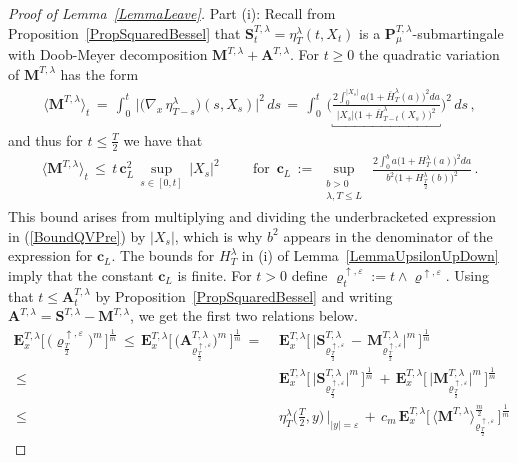 \documentclass[10pt]{article}
\numberwithin{equation}{section}
\theoremstyle{definition}
\begin{document}
\begin{proof}[Proof of Lemma~\ref{LemmaLeave}]  Part (i): Recall from Proposition~\ref{PropSquaredBessel}  that  $\mathbf{S}^{T,\lambda }_t=\eta_{T}^{\lambda}(t,X_t)$ is a $\mathbf{P}^{T,\lambda}_{\mu}$-submartingale with Doob-Meyer decomposition $ \mathbf{M}^{T,\lambda}+ \mathbf{A}^{T,\lambda}$.  For $t\geq 0$ the quadratic variation of $\mathbf{M}^{T,\lambda}$ has the form
\begin{align}\label{BoundQVPre}
 \big\langle \mathbf{M}^{T ,\lambda} \big\rangle_{t}\,=\,\int_0^t \,\Big|\big(\nabla_x\,\eta^{\lambda}_{T-s}\big)(s,X_s)  \Big|^2\, ds\,=\, \int_0^t\, \Bigg( \underbracket{\frac{2\int_0^{|X_s|} a\big( 1+\bar{H}_{T}^{\lambda}(a)\big)^2    da  }{|X_s| \big( 1+\bar{H}_{T-t}^{\lambda}(X_s)\big)^2   }} \Bigg)^2\, ds \,,
 \end{align}
 and thus for $t\leq \frac{T}{2}$ we have that
 \begin{align}\label{BoundQV}
     \big\langle \mathbf{M}^{T ,\lambda} \big\rangle_{t} \,\leq \,t\,\mathbf{c}_{L}^2\,\sup_{s\in [0,t]}\,|X_s|^2 \hspace{1cm}\text{for } \,\mathbf{c}_{L}\,:=\, \sup_{\substack{ b>0 \\ \lambda, T\leq L }} \, \frac{ 2\int_0^b  a\big( 1+H_{T}^{\lambda}(a)\big)^2  da    }{b^2\big( 1+H_{\frac{T}{2}}^{\lambda}(b)\big)^2 } \,.
 \end{align}
 This bound arises from multiplying and dividing the underbracketed expression in (\ref{BoundQVPre}) by $|X_s|$, which is why $b^2$ appears in the denominator of the expression for $\mathbf{c}_{L}$. The bounds for $H_{T}^{\lambda}$ in  (i) of Lemma~\ref{LemmaUpsilonUpDown} imply that  the constant $\mathbf{c}_{L}$ is finite.  For $t>0$ define $\varrho^{\uparrow, \varepsilon}_{t}:=t\wedge\varrho^{\uparrow, \varepsilon}$. 
 Using that $t\leq \mathbf{A}_{t}^{T,\lambda}$ by  Proposition~\ref{PropSquaredBessel} and writing $\mathbf{A}^{T,\lambda}=\mathbf{S}^{T,\lambda}-\mathbf{M}^{T,\lambda}$, we get the first two relations below.
\begin{align}\label{RhoPreArrange}
     \mathbf{E}_{x}^{T,\lambda}\Big[ \,\big(\varrho^{\uparrow, \varepsilon}_{\frac{T}{2}} \big)^m \,\Big]^{\frac{1}{m}}\,\leq \,  \mathbf{E}_{x}^{T,\lambda}\bigg[ \,\Big(\mathbf{A}_{\varrho^{\uparrow, \varepsilon}_{\frac{T}{2}} }^{T,\lambda}\Big)^m \,\bigg]^{\frac{1}{m}}\,=\,&\, \mathbf{E}_{x}^{T,\lambda}\bigg[ \,\Big|  \mathbf{S}_{\varrho^{\uparrow, \varepsilon}_{\frac{T}{2}} }^{T,\lambda}\,-\,\mathbf{M}_{\varrho^{\uparrow, \varepsilon}_{\frac{T}{2}} }^{T,\lambda}  \Big|^m \,\bigg]^{\frac{1}{m}}\nonumber \\ \,\leq \,& \,\mathbf{E}_{x}^{T,\lambda}\bigg[ \,\Big|  \mathbf{S}_{\varrho^{\uparrow, \varepsilon}_{\frac{T}{2}} }^{T,\lambda}\Big|^m \,\bigg]^{\frac{1}{m}}\,+\, \mathbf{E}_{x}^{T,\lambda}\bigg[\, \Big|  \mathbf{M}_{\varrho^{\uparrow, \varepsilon}_{\frac{T}{2}} }^{T,\lambda}  \Big|^{m}\, \bigg]^{\frac{1}{m}}\nonumber \\ \,\leq \,& \,\eta_{T}^{\lambda}\Big(\frac{T}{2},y\Big)\,\Big|_{|y|=\varepsilon} \,+\,c_m \,\mathbf{E}_{x}^{T,\lambda}\Big[ \,  \big\langle \mathbf{M}^{T ,\lambda} \big\rangle_{\varrho^{\uparrow, \varepsilon}_{\frac{T}{2}} }^{\frac{m}{2}} \,\Big]^{\frac{1}{m}}\nonumber 

\end{align}
\end{proof}
\end{document}
